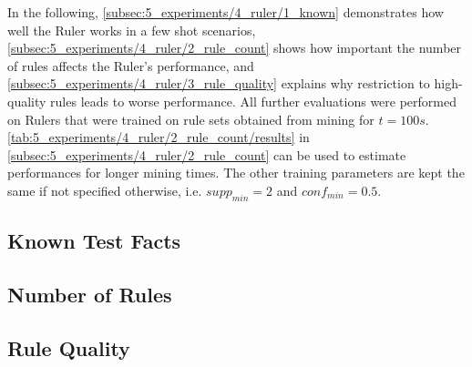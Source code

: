 In the following, \autoref{subsec:5_experiments/4_ruler/1_known} demonstrates how well the Ruler works in a few shot scenarios, \autoref{subsec:5_experiments/4_ruler/2_rule_count} shows how important the number of rules affects the Ruler's performance, and \autoref{subsec:5_experiments/4_ruler/3_rule_quality} explains why restriction to high-quality rules leads to worse performance. All further evaluations were performed on Rulers that were trained on rule sets obtained from mining for $t = 100s$. \autoref{tab:5_experiments/4_ruler/2_rule_count/results} in \autoref{subsec:5_experiments/4_ruler/2_rule_count} can be used to estimate performances for longer mining times. The other training parameters are kept the same if not specified otherwise, i.e. $supp_{min} = 2$ and $conf_{min} = 0.5$.

\subsection{Known Test Facts}
\label{subsec:5_experiments/4_ruler/1_known}


\subsection{Number of Rules}
\label{subsec:5_experiments/4_ruler/2_rule_count}


\subsection{Rule Quality}
\label{subsec:5_experiments/4_ruler/3_rule_quality}

